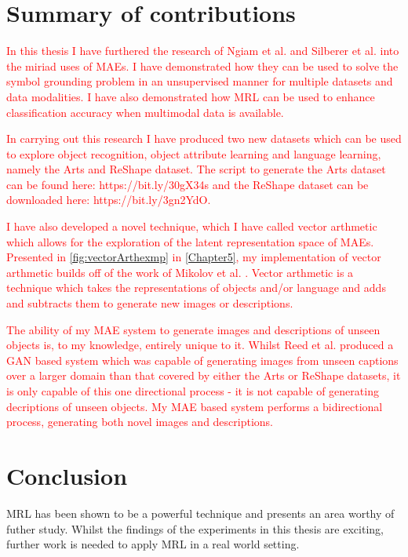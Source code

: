 \section{Summary of contributions}
\textcolor{red}{In this thesis I have furthered the research of Ngiam et al. \cite{ngiam2011multimodal} and Silberer et al. \cite{silberer2014learning} into the miriad uses of \acp{MAE}. I have demonstrated how they can be used to solve the symbol grounding problem in an unsupervised manner for multiple datasets and data modalities. I have also demonstrated how \ac{MRL} can be used to enhance classification accuracy when multimodal data is available.}

\textcolor{red}{In carrying out this research I have produced two new datasets which can be used to explore object recognition, object attribute learning and language learning, namely the Arts and ReShape dataset. The script to generate the Arts dataset can be found here: https://bit.ly/30gX34s and the ReShape dataset can be downloaded here: https://bit.ly/3gn2YdO.}

\textcolor{red}{I have also developed a novel technique, which I have called vector arthmetic which allows for the exploration of the latent representation space of \acp{MAE}. Presented in \autoref{fig:vectorArthexmp} in \autoref{Chapter5}, my implementation of vector arthmetic builds off of the work of Mikolov et al. \cite{mikolov2013distributed, mikolov2013efficient, mikolov2013linguistic}. Vector arthmetic is a technique which takes the representations of objects and/or language and adds and subtracts them to generate new images or descriptions.} 

\textcolor{red}{The ability of my \ac{MAE} system to generate images and descriptions of unseen objects is, to my knowledge, entirely unique to it. Whilst Reed et al. \cite{reed2016generative} produced a GAN based system which was capable of generating images from unseen captions over a larger domain than that covered by either the Arts or ReShape datasets, it is only capable of this one directional process - it is not capable of generating decriptions of unseen objects. My \ac{MAE} based system performs a bidirectional process, generating both novel images and descriptions.}

\section{Conclusion}
\ac{MRL} has been shown to be a powerful technique and presents an area worthy of futher study. Whilst the findings of the experiments in this thesis are exciting, further work is needed to apply \ac{MRL} in a real world setting.

